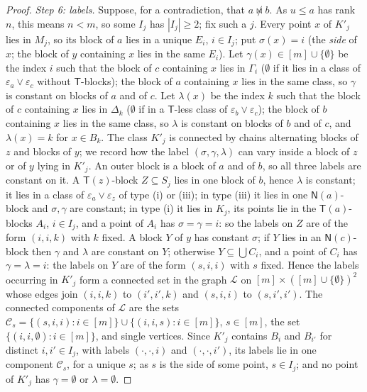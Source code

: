 \documentclass[11pt]{amsart}
\theoremstyle{definition}
\newcommand{\T}{\mathsf{T}}
\newcommand{\N}{\mathsf{N}}
\newcommand{\mt}{\bowtie}   %
\begin{document}
\begin{proof}
\smallskip\emph{Step 6: labels.} Suppose, for a contradiction, that $a\not\mt b$. As $u\le a$ has rank $n$, this means $n<m$, so some $I_j$ has $|I_j|\ge2$; fix such a $j$. Every point $x$ of $K'_j$ lies in $M_j$, so its block of $a$ lies in a unique $E_i$, $i\in I_j$; put $\sigma(x)=i$ (the \emph{side} of $x$; the block of $y$ containing $x$ lies in the same $E_i$). Let $\gamma(x)\in[m]\cup\{\emptyset\}$ be the index $i$ such that the block of $c$ containing $x$ lies in $\Gamma_i$ ($\emptyset$ if it lies in a class of $\varepsilon_a\vee\varepsilon_c$ without $\T$-blocks); the block of $a$ containing $x$ lies in the same class, so $\gamma$ is constant on blocks of $a$ and of $c$. Let $\lambda(x)$ be the index $k$ such that the block of $c$ containing $x$ lies in $\Delta_k$ ($\emptyset$ if in a $\T$-less class of $\varepsilon_b\vee\varepsilon_c$); the block of $b$ containing $x$ lies in the same class, so $\lambda$ is constant on blocks of $b$ and of $c$, and $\lambda(x)=k$ for $x\in B_k$. The class $K'_j$ is connected by chains alternating blocks of $z$ and blocks of $y$; we record how the label $(\sigma,\gamma,\lambda)$ can vary inside a block of $z$ or of $y$ lying in $K'_j$. An outer block is a block of $a$ and of $b$, so all three labels are constant on it. A $\T(z)$-block $Z\subseteq S_j$ lies in one block of $b$, hence $\lambda$ is constant; it lies in a class of $\varepsilon_a\vee\varepsilon_z$ of type (i) or (iii); in type (iii) it lies in one $\N(a)$-block and $\sigma,\gamma$ are constant; in type (i) it lies in $K_j$, its points lie in the $\T(a)$-blocks $A_i$, $i\in I_j$, and a point of $A_i$ has $\sigma=\gamma=i$: so the labels on $Z$ are of the form $(i,i,k)$ with $k$ fixed. A block $Y$ of $y$ has constant $\sigma$; if $Y$ lies in an $\N(c)$-block then $\gamma$ and $\lambda$ are constant on $Y$; otherwise $Y\subseteq\bigcup C_i$, and a point of $C_i$ has $\gamma=\lambda=i$: the labels on $Y$ are of the form $(s,i,i)$ with $s$ fixed. Hence the labels occurring in $K'_j$ form a connected set in the graph $\mathcal L$ on $[m]\times([m]\cup\{\emptyset\})^2$ whose edges join $(i,i,k)$ to $(i',i',k)$ and $(s,i,i)$ to $(s,i',i')$. The connected components of $\mathcal L$ are the sets $\mathcal C_s=\{(s,i,i):i\in[m]\}\cup\{(i,i,s):i\in[m]\}$, $s\in[m]$, the set $\{(i,i,\emptyset):i\in[m]\}$, and single vertices. Since $K'_j$ contains $B_i$ and $B_{i'}$ for distinct $i,i'\in I_j$, with labels $(\cdot,\cdot,i)$ and $(\cdot,\cdot,i')$, its labels lie in one component $\mathcal C_s$, for a unique $s$; as $s$ is the side of some point, $s\in I_j$; and no point of $K'_j$ has $\gamma=\emptyset$ or $\lambda=\emptyset$.


\end{proof}
\end{document}
